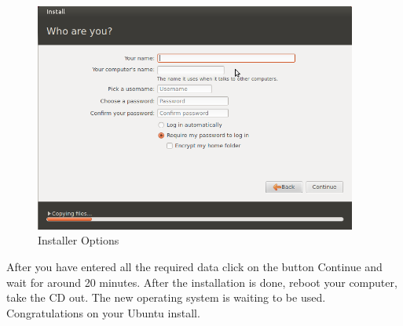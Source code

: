 \begin{figure}[!h]	
	\begin{center}
	\includegraphics[width=300pt]{./images/installation/installer-who.png}
	\caption{Installer Options}	
	\label{fig:installer-who}	
	\end{center}
\end{figure}

\par \noindent After you have entered all the required data click on the button Continue and wait for around 20 minutes. After the installation is done, reboot your computer, take the CD out. The new operating system is waiting to be used. Congratulations on your Ubuntu install.



